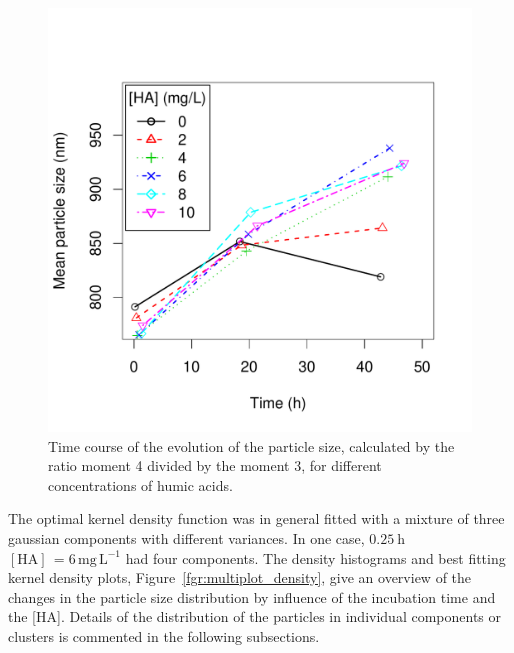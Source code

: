 \documentclass[journal=langd5,manuscript=article]{achemso}
\begin{document}
 \begin{figure}
  \includegraphics[width=\linewidth]{Figures/mean_particle_size.pdf}
  \caption{Time course of the evolution of the particle size, calculated by the  ratio moment 4 divided by the moment 3, for different concentrations of humic acids.} 
  \label{fgr:meansize}
\end{figure}









The optimal  kernel density function was in general fitted with a mixture of three gaussian components with different variances.
In one case,
$0.25~\mathrm{h}$
$\mathrm{[HA]\, = 6\, mg\,L^{-1}}$ had four components. The density histograms and best fitting  kernel density plots,
Figure~\ref{fgr:multiplot_density},
give an overview  of the changes in the particle size distribution by influence of the 
incubation time and the [HA]. 
Details of the distribution of the particles in  individual components or clusters is commented in the following subsections.
\end{document}
